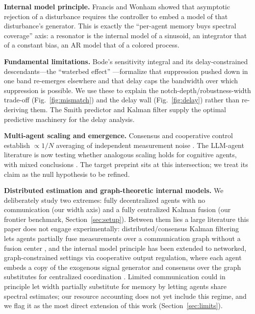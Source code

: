 \documentclass[journal]{IEEEtran}
\begin{document}
\textbf{Internal model principle.} Francis and Wonham \cite{francis1976} showed
that asymptotic rejection of a disturbance requires the controller to embed a
model of that disturbance's generator. This is exactly the ``per-agent memory
buys spectral coverage'' axis: a resonator is the internal model of a sinusoid,
an integrator that of a constant bias, an AR model that of a colored process.

\textbf{Fundamental limitations.} Bode's sensitivity integral and its
delay-constrained descendants---the ``waterbed effect'' \cite{bode1945,seron1997}
---formalize that suppression pushed down in one band re-emerges elsewhere and
that delay caps the bandwidth over which suppression is possible. We use these to
explain the notch-depth/robustness-width trade-off (Fig.~\ref{fig:mismatch}) and
the delay wall (Fig.~\ref{fig:delay}) rather than re-deriving them. The Smith
predictor \cite{smith1957} and Kalman filter \cite{kalman1960} supply the optimal
predictive machinery for the delay analysis.

\textbf{Multi-agent scaling and emergence.} Consensus and cooperative control
establish $\propto 1/N$ averaging of independent measurement noise
\cite{olfati2007,jadbabaie2003,ren2005}. The LLM-agent literature is now testing
whether analogous scaling holds for cognitive agents, with mixed conclusions
\cite{xu2026single,qian2024scaling,tran2026single,cemri2025fail}. The target preprint
\cite{kovalov_preprint} sits at this intersection; we treat its claim as the
null hypothesis to be refined.

\textbf{Distributed estimation and graph-theoretic internal models.} We
deliberately study two extremes: fully decentralized agents with no
communication (our width axis) and a fully centralized Kalman fusion (our
frontier benchmark, Section~\ref{sec:setup}). Between them lies a large
literature this paper does not engage experimentally: distributed/consensus
Kalman filtering lets agents partially fuse measurements over a communication
graph without a fusion center \cite{olfati2005distributed}, and the internal
model principle has been extended to networked, graph-constrained settings via
cooperative output regulation, where each agent embeds a copy of the exogenous
signal generator and consensus over the graph substitutes for centralized
coordination \cite{su2012cooperative}. Limited communication could in principle
let width partially substitute for memory by letting agents share spectral
estimates; our resource accounting does not yet include this regime, and we
flag it as the most direct extension of this work (Section~\ref{sec:limits}).
\end{document}
